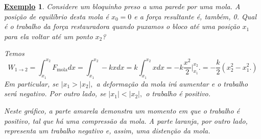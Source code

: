 \documentclass{article}
\newtheorem{example}{\underline{Exemplo}}
\begin{document}
\begin{example}
   Considere um bloquinho preso a uma parede por uma mola. A posi\c cão de equilíbrio 
   desta mola é \(x_{0}=0\) e a for\c ca resultante é, também, 0. Qual é o trabalho 
   da for\c ca restauradora quando puxamos o bloco até uma posi\c cão \(x_{1}\) para ela
   voltar até um ponto \(x_{2}\)?

   Temos 
     \[
       W_{1\rightarrow 2} = \int_{x_1}^{x_2}F_{\text{mola}}dx = \int_{x_1}^{x_2} -kxdx = 
       k \int_{x_1}^{x_2}xdx = -k \frac{x^{2}}{2}\biggl|_{x_1}^{x_2}\biggr. = -\frac{k}{2}(x_{2}^{2} - x_{1}^{2}.)
     \]
     Em particular, se \(|x_{1} > |x_{2}|,\) a deforma\c cão da mola irá aumentar e o trabalho será negativo. 
     Por outro lado, se \(|x_{1}| < |x_{2}|, \) o trabalho é positivo. 

  Neste gráfico, a parte amarela demonstra um momento em que o trabalho é positivo,
  tal que há uma compressão da mola. A parte laranja, por outro lado, representa um
  trabalho negativo e, assim, uma disten\c cão da mola.
\end{example}
\end{document}
